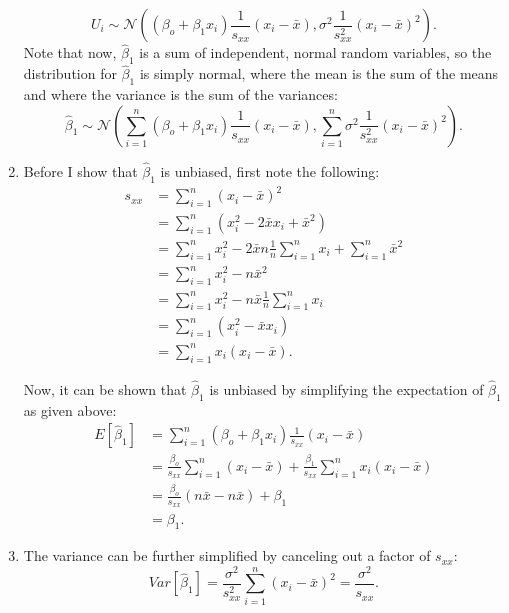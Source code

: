 \begin{problem}{23}
\begin{enumerate}
\begin{equation*}
U_i \sim \mathcal N \left ((\beta_o+\beta_1x_i)\frac{1}{s_{xx}}(x_i-\bar x), \sigma^2 \frac{1}{s_{xx}^2}(x_i-\bar x)^2 \right).
\end{equation*}
Note that now, $\hat \beta_1$ is a sum of independent, normal random variables, so the distribution for $\hat \beta_1$ is simply normal, where the mean is the sum of the means and where the variance is the sum of the variances:
\begin{equation*}
\hat \beta_1  \sim \mathcal N \left ( \sum_{i=1}^n(\beta_o+\beta_1x_i)\frac{1}{s_{xx}}(x_i-\bar x),  \sum_{i=1}^n \sigma^2 \frac{1}{s_{xx}^2}(x_i-\bar x)^2 \right).
\end{equation*}

\item  Before I show that $\hat \beta_1$ is unbiased, first note the following:
\begin{align*}
s_{xx} &= \sum_{i=1}^n (x_i-\bar x)^2 \\
&= \sum_{i=1}^n (x_i^2-2\bar x x_i +\bar x^2) \\
&= \sum_{i=1}^n x_i^2-2\bar x n \frac{1}{n}\sum_{i=1}^n x_i +  \sum_{i=1}^n\bar x^2 \\
&= \sum_{i=1}^n x_i^2-n \bar x ^2 \\
&= \sum_{i=1}^n x_i^2-n \bar x \frac{1}{n}\sum_{i=1}^n x_i \\
&= \sum_{i=1}^n (x_i^2-\bar x  x_i) \\
&= \sum_{i=1}^n x_i(x_i-\bar x ).
\end{align*}

Now, it can be shown that $\hat \beta_1$ is unbiased by simplifying the expectation of $\hat \beta_1$ as given above:
\begin{align*}
E[\hat \beta_1] & = \sum_{i=1}^n(\beta_o+\beta_1x_i)\frac{1}{s_{xx}}(x_i-\bar x) \\
& = \frac{\beta_o}{s_{xx}}\sum_{i=1}^n(x_i -\bar x)+ \frac{\beta_1}{s_{xx}}\sum_{i=1}^n x_i(x_i -\bar x) \\
& = \frac{\beta_o}{s_{xx}}(n \bar x -n\bar x)+ \beta_1 \\
& = \beta_1.
\end{align*}

\item  The variance can be further simplified by canceling out a factor of $s_{xx}$:
\begin{equation*}
Var [\hat \beta_1] = \frac{\sigma^2}{s_{xx}^2}\sum_{i=1}^n (x_i-\bar x)^2 = \frac{\sigma^2}{s_{xx}}.
\end{equation*}

\end{enumerate}

\end{problem}


